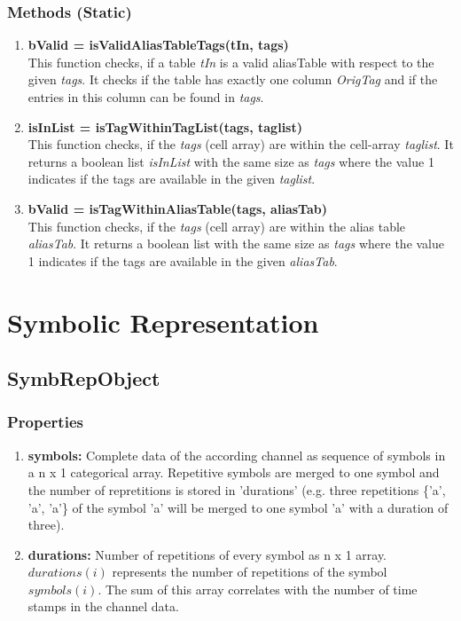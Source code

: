 \documentclass[a4]{scrreprt}
\begin{document}
\subsubsection{Methods (Static)}
\begin{enumerate}
	
	\item \textbf{bValid = isValidAliasTableTags(tIn, tags)}\\
	This function checks, if a table \textit{tIn} is a valid aliasTable with respect to the given \textit{tags}. It checks if the table has exactly one column \textit{OrigTag} and if the entries in this column can be found in \textit{tags}.
	
	\item \textbf{isInList = isTagWithinTagList(tags, taglist)}\\
	This function checks, if the \textit{tags} (cell array) are within the cell-array  \textit{taglist}. It returns a boolean list \textit{isInList} with the same size as \textit{tags} where the value 1 indicates if the tags are available in the given \textit{taglist}.
	
	\item \textbf{bValid = isTagWithinAliasTable(tags, aliasTab)}\\
	This function checks, if the \textit{tags} (cell array) are within the alias table  \textit{aliasTab}. It returns a boolean list with the same size as \textit{tags} where the value 1 indicates if the tags are available in the given \textit{aliasTab}.
\end{enumerate}

\section{Symbolic Representation}
\label{ChpSymbolicRepresentation}

\subsection{SymbRepObject}
\label{ChpDescriptionSymbRepObject}

\subsubsection{Properties}

\begin{enumerate}
	\item \textbf{symbols:} Complete data of the according channel as sequence of symbols in a n x 1 categorical array. Repetitive symbols are merged to one symbol and the number of repretitions is stored in 'durations' (e.g. three repetitions \{'a', 'a', 'a'\} of the symbol 'a' will be merged to one symbol 'a' with a duration of three).
	\item \textbf{durations:} Number of repetitions of every symbol as n x 1 array. $durations(i)$ represents the number of repetitions of the symbol $symbols(i)$. The sum of this array correlates with the number of time stamps in the channel data.
\end{enumerate}
\end{document}
